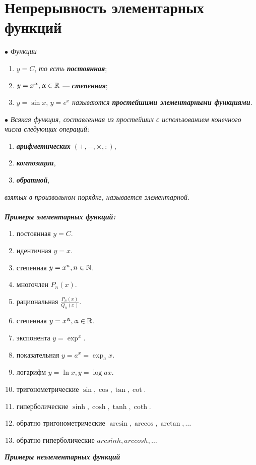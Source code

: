 \section{Непрерывность элементарных функций}
$\bullet$ \textit{Функции}
\begin{enumerate}
	\item $y = C$, \textit{то есть \textbf{постоянная}}; 
	\item $y = x^{\upalpha}, \upalpha \in \mathbb{R}$ --- \textit{\textbf{степенная}}; 
	\item $y = \sin{x}$, $y = e^{x}$  \textit{называются \textbf{простейшими элементарными функциями}.}
\end{enumerate}
$\bullet$\textit{ Всякая функция, составленная из простейших с использованием конечного числа следующих операций:}
\begin{enumerate}
	\item \textit{\textbf{арифметических}} $(+, -, \times, :)$,
	\item \textbf{\textit{композиции}},
	\item \textbf{\textit{обратной}},
\end{enumerate}
\textit{взятых в произвольном порядке, называется элементарной.}\\\\
\textit{\textbf{Примеры элементарных функций:}}
\begin{enumerate}
	\item постоянная $y = C$.
	\item идентичная $y = x$.
	\item степенная $y = x^{n}, n \in \mathbb{N}$.
	\item многочлен $P_{n}(x)$.
	\item рациональная $\frac{P_{n}(x)}{Q_{n}(x)}$.
	\item степенная $y = x^{\upalpha}, \upalpha \in \mathbb{R}$.
	\item экспонента $y = \exp^{x}$.
	\item показательная $y = a^{x} = \exp_{a}{x}$.
	\item логарифм $ y = \ln{x}, y = \log{a}{x}$.
	\item тригонометрические $\sin, \cos, \tan, \cot$.
	\item гиперболические $\sinh, \cosh, \tanh, \coth$.
	\item обратно тригонометрические $\arcsin, \arccos, \arctan, \dots$
	\item обратно гиперболические $arcsinh, arccosh, \dots$ 
\end{enumerate}
\textit{\textbf{Примеры неэлементарных функций}}
